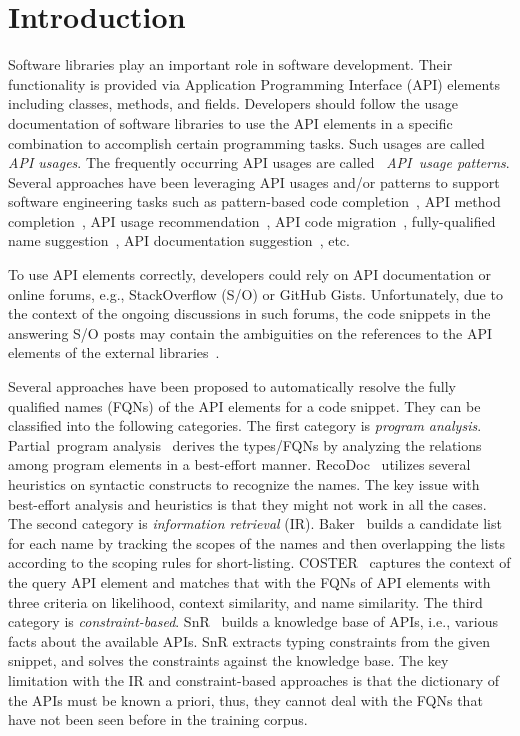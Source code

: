 \section{Introduction}
\label{sec:intro}

Software libraries play an important role in software
development. Their functionality is provided via Application
Programming Interface (API) elements including classes, methods, and
fields. Developers should follow the usage documentation of software
libraries to use the API elements in a specific combination to
accomplish certain programming tasks. Such usages are called {\em API
  usages}. The frequently occurring API usages are called~{\em
  API~usage patterns}. Several approaches have been leveraging API
usages and/or patterns to support software engineering tasks such as
pattern-based code completion~\cite{icse12}, API method
completion~\cite{fse16}, API usage recommendation~\cite{icsme18}, API
code migration~\cite{ase14}, fully-qualified name
suggestion~\cite{icse18}, API documentation
suggestion~\cite{liveapi14}, etc.

To use API elements correctly, developers could rely on API
documentation or online forums, e.g., StackOverflow (S/O) or GitHub
Gists. Unfortunately, due to the context of the ongoing discussions in
such forums, the code snippets in the answering S/O posts may contain
the ambiguities on the references to the API elements of the external
libraries~\cite{liveapi14}.

Several approaches have been proposed to automatically resolve the
fully qualified names (FQNs) of the API elements for a code
snippet. They can be classified into the following categories. The
first category is {\em program analysis}. Partial~program
analysis~\cite{dagenais-oopsla08} derives the types/FQNs by analyzing
the relations among program elements in a best-effort
manner. RecoDoc~\cite{dagenais-icse12} utilizes several heuristics on
syntactic constructs to recognize the names. The key issue with
best-effort analysis and heuristics is that they might not work in all
the cases. The second category is {\em information retrieval}
(IR). Baker~\cite{liveapi14} builds a candidate list for each name by
tracking the scopes of the names and then overlapping the lists
according to the scoping rules for short-listing.
COSTER~\cite{coster-ase19} captures the context of the query API
element and matches that with the FQNs of API elements with three
criteria on likelihood, context similarity, and name similarity.  The
third category is {\em constraint-based}. SnR~\cite{snr-icse22} builds
a knowledge base of APIs, i.e., various facts about the available
APIs. SnR extracts typing constraints from the given snippet, and
solves the constraints against the knowledge base. The key limitation
with the IR and constraint-based approaches is that the dictionary of
the APIs must be known a priori, thus, they cannot deal with the FQNs
that have not been seen before in the training corpus.

